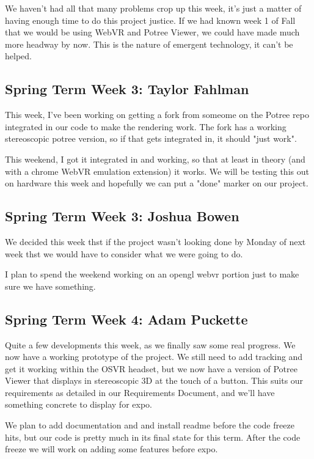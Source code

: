 \documentclass[draftclsnofoot,onecolumn]{IEEEtran}
\begin{document}
We haven't had all that many problems crop up this week, it's just a matter of having enough time to do this project justice. If we had known week 1 of Fall that we would be using WebVR and Potree Viewer, we could have made much more headway by now. This is the nature of emergent technology, it can't be helped.

\subsection{Spring Term Week 3: Taylor Fahlman}

This week, I've been working on getting a fork from someome on the Potree repo integrated in our code to make the rendering work. The fork has a working stereoscopic potree version, so if that gets integrated in, it should "just work".

This weekend, I got it integrated in and working, so that at least in theory (and with a chrome WebVR emulation extension) it works. We will be testing this out on hardware this week and hopefully we can put a "done" marker on our project.

\subsection{Spring Term Week 3: Joshua Bowen}

We decided this week thst if the project wasn't looking done by Monday of next week thst we would have to consider what we were going to do.

I plan to spend the weekend working on an opengl webvr portion just to make sure we have something.

\subsection{Spring Term Week 4: Adam Puckette}

Quite a few developments this week, as we finally saw some real progress. We now have a working prototype of the project. We still need to add tracking and get it working within the OSVR headset, but we now have a version of Potree Viewer that displays in stereoscopic 3D at the touch of a button. This suits our requirements as detailed in our Requirements Document, and we'll have something concrete to display for expo.

We plan to add documentation and and install readme before the code freeze hits, but our code is pretty much in its final state for this term. After the code freeze we will work on adding some features before expo.
\end{document}

